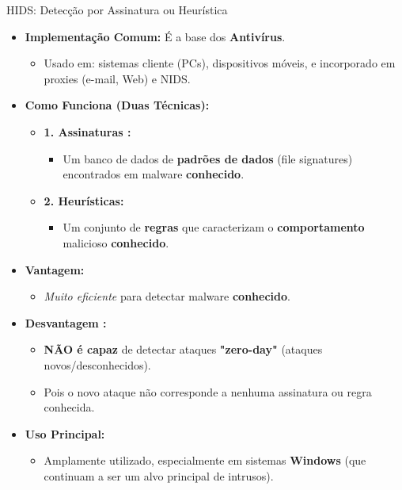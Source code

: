 \begin{frame}{HIDS: Detecção por Assinatura ou Heurística}
    \begin{itemize}


        \item \textbf{Implementação Comum:} É a base dos \textbf{Antivírus}.
              \begin{itemize}
                  \item Usado em: sistemas cliente (PCs), dispositivos móveis, e incorporado em proxies (e-mail, Web) e NIDS.
              \end{itemize}

        \item \textbf{Como Funciona (Duas Técnicas):}
              \begin{itemize}
                  \item \textbf{1. Assinaturas :}
                        \begin{itemize}
                            \item Um banco de dados de \textbf{padrões de dados} (file signatures) encontrados em malware \textbf{conhecido}.
                        \end{itemize}
                  \item \textbf{2. Heurísticas:}
                        \begin{itemize}
                            \item Um conjunto de \textbf{regras} que caracterizam o \textbf{comportamento} malicioso \textbf{conhecido}.
                        \end{itemize}
              \end{itemize}

        \item \textbf{Vantagem:}
              \begin{itemize}
                  \item \textit{Muito eficiente} para detectar malware \textbf{conhecido}.
              \end{itemize}

        \item \textbf{Desvantagem :}
              \begin{itemize}
                  \item \textbf{NÃO é capaz} de detectar ataques \textbf{"zero-day"} (ataques novos/desconhecidos).
                  \item Pois o novo ataque não corresponde a nenhuma assinatura ou regra conhecida.
              \end{itemize}

        \item \textbf{Uso Principal:}
              \begin{itemize}
                  \item Amplamente utilizado, especialmente em sistemas \textbf{Windows} (que continuam a ser um alvo principal de intrusos).
              \end{itemize}
    \end{itemize}
\end{frame}

